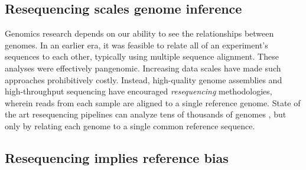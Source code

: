 

\subsection{Resequencing scales genome inference}

Genomics research depends on our ability to see the relationships between genomes.
In an earlier era, it was feasible to relate all of an experiment's sequences to each other, typically using multiple sequence alignment.
These analyses were effectively pangenomic. 
Increasing data scales have made such approaches prohibitively costly.
Instead, high-quality genome assemblies and high-throughput sequencing have encouraged \emph{resequencing} methodologies, wherein reads from each sample are aligned to a single reference genome.
State of the art resequencing pipelines can analyze tens of thousands of genomes \cite{Poplin_2017}, but only by relating each genome to a single common reference sequence.

\subsection{Resequencing implies reference bias}

